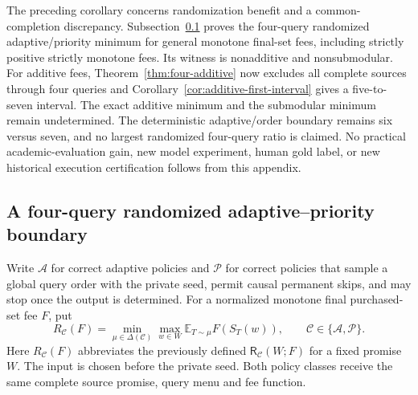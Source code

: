 \documentclass[pdflatex,sn-mathphys-num]{sn-jnl}
\newcommand{\RR}{\mathsf{R}}
\theoremstyle{thmstyleone}
\theoremstyle{thmstylethree}
\theoremstyle{thmstyletwo}
\begin{document}
The preceding corollary concerns randomization benefit and a common-completion discrepancy. Subsection~\ref{app:randomized-adaptive-priority-gap-candidate} proves the four-query randomized adaptive/priority minimum for general monotone final-set fees, including strictly positive strictly monotone fees. Its witness is nonadditive and nonsubmodular. For additive fees, Theorem~\ref{thm:four-additive} now excludes all complete sources through four queries and Corollary~\ref{cor:additive-first-interval} gives a five-to-seven interval. The exact additive minimum and the submodular minimum remain undetermined. The deterministic adaptive/order boundary remains six versus seven, and no largest randomized four-query ratio is claimed. No practical academic-evaluation gain, new model experiment, human gold label, or new historical execution certification follows from this appendix.


\subsection{A four-query randomized adaptive--priority boundary}
\label{app:randomized-adaptive-priority-gap-candidate}

Write $\mathcal A$ for correct adaptive policies and $\mathcal P$ for
correct policies that sample a global query order with the private seed,
permit causal permanent skips, and may stop once the output is determined.
For a normalized monotone final purchased-set fee $F$, put
\[
 R_{\mathcal C}(F)=\min_{\mu\in\Delta(\mathcal C)}
       \max_{w\in W}\mathbb E_{T\sim\mu}F(S_T(w)),
 \qquad \mathcal C\in\{\mathcal A,\mathcal P\}.
\]
Here $R_{\mathcal C}(F)$ abbreviates the previously defined
$\RR_{\mathcal C}(W;F)$ for a fixed promise $W$.
The input is chosen before the private seed. Both policy classes receive
the same complete source promise, query menu and fee function.
\end{document}

